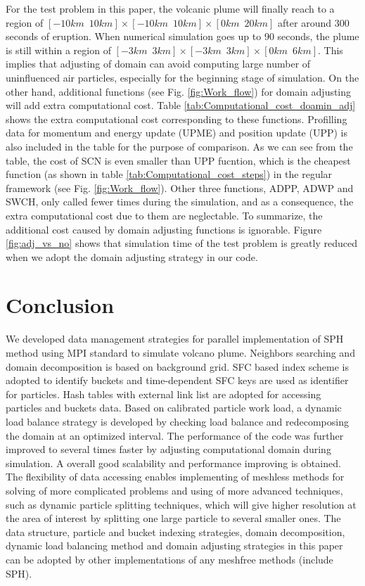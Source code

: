 \documentclass[procedia]{easychair}
\begin{document}
For the test problem in this paper, the volcanic plume will finally reach to a region of $[-10km \,\,\, 10km] \times [-10km\,\,\,10km] \times [0km\,\,\,20km]$ after around 300 seconds of eruption. When numerical simulation goes up to 90 seconds, the plume is still within a region of $[-3km\,\,\,3km] \times [-3km\,\,\,3km] \times [0km\,\,\,6km]$. This implies that adjusting of domain can avoid computing large number of uninfluenced air particles, especially for the beginning stage of simulation. On the other hand, additional functions (see Fig. \ref{fig:Work_flow}) for domain adjusting will add extra computational cost. Table \ref{tab:Computational_cost_doamin_adj} shows the extra computational cost corresponding to these functions. Profilling data for momentum and energy update (UPME) and position update (UPP) is also included in the table for the purpose of comparison. As we can see from the table, the cost of SCN is even smaller than UPP fucntion, which is the cheapest function (as shown in table \ref{tab:Computational_cost_steps}) in the regular framework (see Fig. \ref{fig:Work_flow}). Other three functions, ADPP, ADWP and SWCH, only called fewer times during the simulation, and as a consequence, the extra computational cost due to them are neglectable. To summarize, the additional cost caused by domain adjusting functions is ignorable.
Figure \ref{fig:adj_vs_no} shows that simulation time of the test problem is greatly reduced when we adopt the domain adjusting strategy in our code.
\section{Conclusion}
We developed data management strategies for parallel implementation of SPH method using MPI standard to simulate volcano plume. Neighbors searching and domain decomposition is based on background grid. SFC based index scheme is adopted to identify buckets and time-dependent SFC keys are  used as identifier for particles. 
Hash tables with external link list are adopted for accessing particles and buckets data. Based on calibrated particle work load, a dynamic load balance strategy is developed by checking load balance and redecomposing the domain at an optimized interval. The performance of the code was further improved to several times faster by adjusting computational domain during simulation. 
A overall good scalability and performance improving is obtained.\\
The flexibility of data accessing enables implementing of meshless methods for solving of more complicated problems and using of more advanced techniques, such as dynamic particle splitting techniques\cite{vacondio2012accurate, feldman2007dynamic}, which will give higher resolution at the area of interest by splitting one large particle to several smaller ones. The data structure, particle and bucket indexing strategies, domain decomposition, dynamic load balancing method and domain adjusting strategies in this paper can be adopted by other implementations of any meshfree methods (include SPH).
%
\label{sect:bib}

%
%
%

\end{document}
